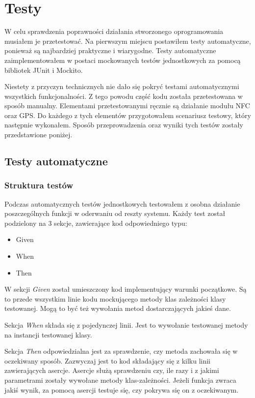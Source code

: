 \documentclass{xmgr}
\begin{document}
\chapter{Testy} 

W celu sprawdzenia poprawności działania stworzonego oprogramowania musiałem je przetestować. Na pierwszym miejscu postawiłem testy automatyczne, ponieważ są najbardziej praktyczne i wiarygodne. Testy automatyczne zaimplementowałem w postaci mockowanych testów jednostkowych za pomocą bibliotek JUnit i Mockito.

Niestety z przyczyn technicznych nie dało się pokryć testami automatycznymi wszystkich funkcjonalności. Z tego powodu część kodu została przetestowana w sposób manualny. Elementami przetestowanymi ręcznie są działanie modułu NFC oraz GPS. Do każdego z tych elementów przygotowałem scenariusz testowy, który następnie wykonałem. Sposób przeprowadzenia oraz wyniki tych testów zostały przedstawione poniżej.

\section{Testy automatyczne}
\subsection{Struktura testów}
Podczas  automatycznych testów jednostkowych testowałem z osobna działanie poszczególnych funkcji w oderwaniu od reszty systemu. Każdy test został podzielony na 3 sekcje, zawierające kod odpowiedniego typu:
\begin{itemize}
\item Given
\item When
\item Then
\end{itemize}

W sekcji \textit{Given} został umieszczony kod implementujący warunki początkowe. Są to przede wszystkim linie kodu mockującego metody klas zależności klasy testowanej. Mogą to być też wywołania metod dostarczających jakieś dane. 

Sekcja \textit{When} składa się z pojedynczej linii. Jest to wywołanie testowanej metody na instancji testowanej klasy.

Sekcja \textit{Then} odpowiedzialna jest za sprawdzenie, czy metoda zachowała się w oczekiwany sposób. Zazwyczaj jest to kod składający się z kilku linii zawierających asercje. Asercje służą sprawdzeniu czy, ile razy i z jakimi parametrami zostały wywołane metody klas-zależności. Jeżeli funkcja zwraca jakiś wynik, za pomocą asercji testuje się, czy pokrywa się on z oczekiwanym.
\end{document}
